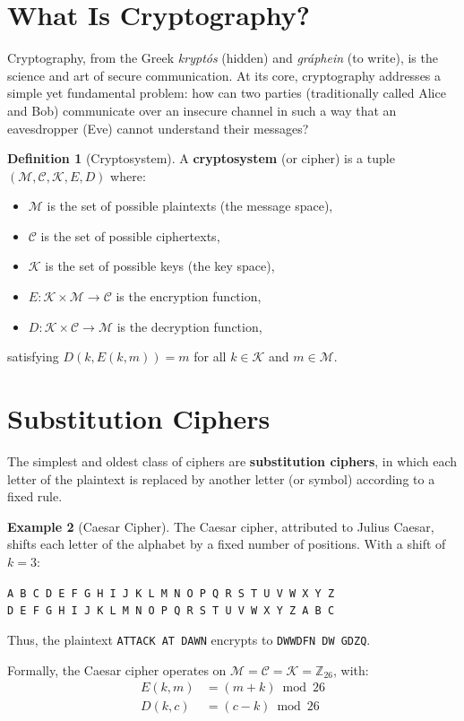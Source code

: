 \documentclass[12pt,a4paper,openany]{book}
\theoremstyle{definition}
\newtheorem{definition}{Definition}[chapter]
\newtheorem{example}[definition]{Example}
\theoremstyle{plain}
\begin{document}
\section{What Is Cryptography?}

Cryptography, from the Greek \textit{krypt\'{o}s} (hidden) and \textit{gr\'{a}phein} (to write), is the science and art of secure communication. At its core, cryptography addresses a simple yet fundamental problem: how can two parties (traditionally called Alice and Bob) communicate over an insecure channel in such a way that an eavesdropper (Eve) cannot understand their messages?

\begin{definition}[Cryptosystem]
A \textbf{cryptosystem} (or cipher) is a tuple $(\mathcal{M}, \mathcal{C}, \mathcal{K}, E, D)$ where:
\begin{itemize}
  \item $\mathcal{M}$ is the set of possible plaintexts (the message space),
  \item $\mathcal{C}$ is the set of possible ciphertexts,
  \item $\mathcal{K}$ is the set of possible keys (the key space),
  \item $E: \mathcal{K} \times \mathcal{M} \to \mathcal{C}$ is the encryption function,
  \item $D: \mathcal{K} \times \mathcal{C} \to \mathcal{M}$ is the decryption function,
\end{itemize}
satisfying $D(k, E(k, m)) = m$ for all $k \in \mathcal{K}$ and $m \in \mathcal{M}$.
\end{definition}

\section{Substitution Ciphers}

The simplest and oldest class of ciphers are \textbf{substitution ciphers}, in which each letter of the plaintext is replaced by another letter (or symbol) according to a fixed rule.

\begin{example}[Caesar Cipher]
The Caesar cipher, attributed to Julius Caesar, shifts each letter of the alphabet by a fixed number of positions. With a shift of $k = 3$:
\begin{center}
\texttt{A B C D E F G H I J K L M N O P Q R S T U V W X Y Z}\\
\texttt{D E F G H I J K L M N O P Q R S T U V W X Y Z A B C}
\end{center}
Thus, the plaintext \texttt{ATTACK AT DAWN} encrypts to \texttt{DWWDFN DW GDZQ}.

Formally, the Caesar cipher operates on $\mathcal{M} = \mathcal{C} = \mathcal{K} = \mathbb{Z}_{26}$, with:
\begin{align}
  E(k, m) &= (m + k) \bmod 26 \\
  D(k, c) &= (c - k) \bmod 26
\end{align}
\end{example}
\end{document}
